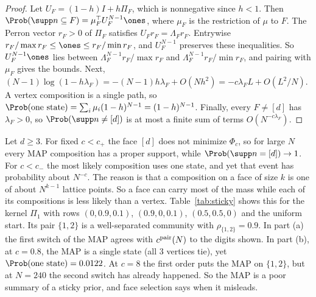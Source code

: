 \begin{proof}
Let $U_F=(1-h)I+h\Pi_F$, which is nonnegative since $h<1$. Then
$\Prob(\supp n\subseteq F)=\mu_F^{\top}U_F^{N-1}\ones$, where $\mu_F$ is the
restriction of $\mu$ to $F$. The Perron vector $r_F>0$ of $\Pi_F$ satisfies
$U_Fr_F=\Lambda_Fr_F$. Entrywise $r_F/\max r_F\le\ones\le r_F/\min r_F$, and
$U_F^{N-1}$ preserves these inequalities. So $U_F^{N-1}\ones$ lies between
$\Lambda_F^{N-1}r_F/\max r_F$ and $\Lambda_F^{N-1}r_F/\min r_F$, and pairing
with $\mu_F$ gives the bounds. Next,
$(N-1)\log(1-h\lambda_F)=-(N-1)h\lambda_F+O(Nh^2)=-c\lambda_FL+O(L^2/N)$.
A vertex composition is a single path, so
$\Prob(\text{one state})=\sum_i\mu_i(1-h)^{N-1}=(1-h)^{N-1}$. Finally, every
$F\ne[d]$ has $\lambda_F>0$, so $\Prob(\supp n\ne[d])$ is at most a finite
sum of terms $O(N^{-c\lambda_F})$.
\end{proof}

\begin{remark}\label{rem:mapmass}
Let $d\ge3$. For fixed $c<c_+$ the face $[d]$ does not minimize $\Phi_c$, so
for large $N$ every MAP composition has a proper support, while
$\Prob(\supp n=[d])\to1$. For $c<c_-$ the most likely composition uses one
state, and yet that event has probability about $N^{-c}$. The reason is that
a composition on a face of size $k$ is one of about $N^{k-1}$ lattice points.
So a face can carry most of the mass while each of its compositions is less
likely than a vertex. Table~\ref{tab:sticky} shows this for the kernel
$\Pi_1$ with rows $(0,0.9,0.1)$, $(0.9,0,0.1)$, $(0.5,0.5,0)$ and the
uniform start. Its pair $\{1,2\}$ is a well-separated community with
$\rho_{\{1,2\}}=0.9$. In part (a) the first switch of the MAP agrees with
$c^{\rm pair}(N)$ to the digits shown. In part (b), at $c=0.8$, the MAP is a
single state (all 3 vertices tie), yet $\Prob(\text{one state})=0.0122$. At
$c=8$ the first order puts the MAP on $\{1,2\}$, but at $N=240$ the second
switch has already happened. So the MAP is a poor summary of a sticky prior,
and face selection says when it misleads.
\end{remark}

